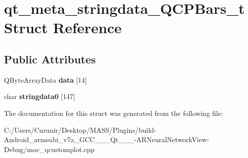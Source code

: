 \hypertarget{structqt__meta__stringdata___q_c_p_bars__t}{}\section{qt\+\_\+meta\+\_\+stringdata\+\_\+\+Q\+C\+P\+Bars\+\_\+t Struct Reference}
\label{structqt__meta__stringdata___q_c_p_bars__t}
\subsection*{Public Attributes}
\begin{DoxyCompactItemize}
\item 
\mbox{\label{structqt__meta__stringdata___q_c_p_bars__t_a1bccfbbe0700115b4884f44462b1c071}} 
Q\+Byte\+Array\+Data {\bfseries data} \mbox{[}14\mbox{]}
\item 
\mbox{\label{structqt__meta__stringdata___q_c_p_bars__t_a2240a76687ae8009db2d5d936e42912f}} 
char {\bfseries stringdata0} \mbox{[}147\mbox{]}
\end{DoxyCompactItemize}


The documentation for this struct was generated from the following file\+:\begin{DoxyCompactItemize}
\item 
C\+:/\+Users/\+Curunir/\+Desktop/\+M\+A\+S\+S/\+Plugins/build-\/\+Android\+\_\+armeabi\+\_\+v7a\+\_\+\+G\+C\+C\+\_\+\_\+\_\+\+Qt\+\_\+\_\+\_-\/\+A\+R\+Neural\+Network\+View-\/\+Debug/moc\+\_\+qcustomplot.\+cpp\end{DoxyCompactItemize}
